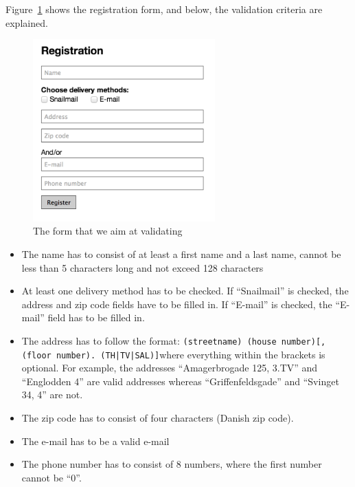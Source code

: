 		Figure~\ref{registrationForm} shows the registration form, and below, the validation criteria are explained.

		\begin{figure}
			\begin{center}
				\centerline{\includegraphics[width=7cm]{resources/images/registrationform.png}}
			\end{center}
			\caption{The form that we aim at validating}
			\label{registrationForm}
		\end{figure}

		\begin{itemize}
			\item The name has to consist of at least a first name and a last name, cannot be less than 5 characters long and not exceed 128 characters
			\item At least one delivery method has to be checked. If “Snailmail” is checked, the address and zip code fields have to be filled in. If “E-mail” is checked, the “E-mail” field has to be filled in.
			\item The address has to follow the format: \newline\newline \texttt{(streetname) (house number)[, (floor number). (TH|TV|SAL)]}\newline\newline where everything within the brackets is optional. For example, the addresses ``Amagerbrogade 125, 3.TV'' and ``Englodden 4'' are valid addresses whereas ``Griffenfeldsgade'' and ``Svinget 34, 4'' are not.
			\item The zip code has to consist of four characters (Danish zip code).
			\item The e-mail has to be a valid e-mail
			\item The phone number has to consist of 8 numbers, where the first number cannot be “0”.
		\end{itemize}

